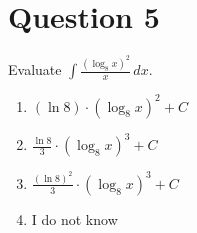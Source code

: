 
\section*{Question 5}
Evaluate $\displaystyle\int\frac{(\log_8 x)^2}{x}\,dx$.
    
\begin{enumerate}[label = \alph*.]
    \item $\displaystyle(\ln 8)\cdot(\log_8 x)^2+C$
    \item $\displaystyle\frac{\ln 8}{3}\cdot(\log_8 x)^3+C$
    \item $\displaystyle\frac{(\ln 8)^2}{3}\cdot(\log_8 x)^3+C$
    \item I do not know
\end{enumerate}

\setcounter{solutionMainStep}{0}
\setcounter{solutionSubStep}{0}

